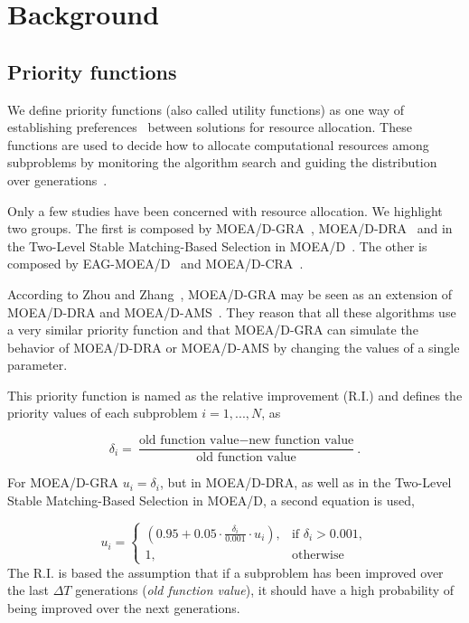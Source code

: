 \section{Background}

\subsection{Priority functions}

We define priority functions (also called utility functions) as one way of establishing preferences~\cite{chankong1983multiobjective} between solutions for resource allocation. These functions are used to decide how to allocate computational resources among subproblems by monitoring the algorithm search and guiding the distribution over generations~\cite{cai2015external}. 

Only a few studies have been concerned with resource allocation. We highlight two groups. The first is composed by MOEA/D-GRA~\cite{zhou2016all}, MOEA/D-DRA~\cite{zhang2009performance} and in the Two-Level Stable Matching-Based Selection in MOEA/D~\cite{nasir2011improved}. The other is composed by EAG-MOEA/D~\cite{cai2015external} and MOEA/D-CRA~\cite{kang2018collaborative}.

According to Zhou and Zhang~\cite{zhou2016all}, MOEA/D-GRA may be seen as an extension of MOEA/D-DRA and MOEA/D-AMS~\cite{chiang2011moea}. They reason that all these algorithms use a very similar priority function and that MOEA/D-GRA can simulate the behavior of MOEA/D-DRA or MOEA/D-AMS by changing the values of a single parameter. 

This priority function is named as the relative improvement (R.I.) and defines the priority values of each subproblem $i=1,...,N$, as

\begin{equation}\label{priority}
	\delta_i = \dfrac{\text{old function value}-\text{new function value}}{\text{old function value}}.
\end{equation}

For MOEA/D-GRA $u_i = \delta_i$, but in MOEA/D-DRA, as well as in the Two-Level Stable Matching-Based Selection in MOEA/D, a second equation is used,

\[
u_i= 
\begin{cases}

(0.95 + 0.05 \cdot \frac{\delta_i}{0.001} \cdot u_i), & \text{if } \delta_i > 0.001,
\\
1,              & \text{otherwise}

\end{cases}\label{priority2}
\]
The R.I. is based the assumption that if a subproblem has been improved over the last $\Delta T$ generations (\textit{old function value}), it should have a high probability of being improved over the next generations. 
	
